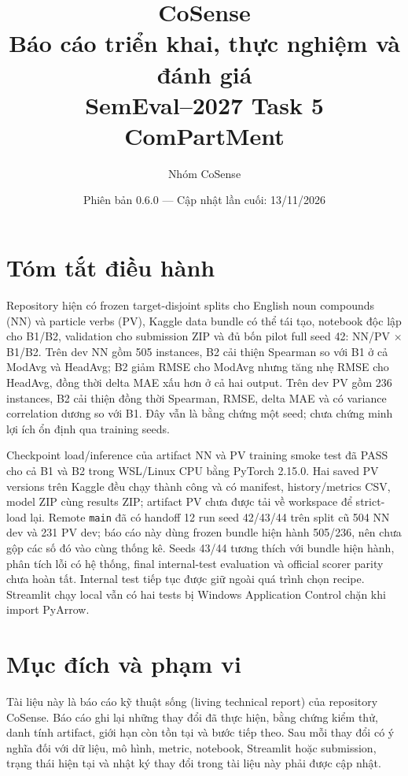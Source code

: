 \documentclass[11pt,a4paper]{article}
\title{\textbf{CoSense}\\Báo cáo triển khai, thực nghiệm và đánh giá\\SemEval--2027 Task 5 ComPartMent}
\author{Nhóm CoSense}
\date{Phiên bản 0.6.0 --- Cập nhật lần cuối: 13/11/2026}
\newcommand{\code}[1]{\nolinkurl{#1}}
\begin{document}
\maketitle
\tableofcontents
\newpage

\section{Tóm tắt điều hành}

Repository hiện có frozen target-disjoint splits cho English noun compounds (NN) và particle verbs (PV), Kaggle data bundle có thể tái tạo, notebook độc lập cho B1/B2, validation cho submission ZIP và đủ bốn pilot full seed 42: NN/PV $\times$ B1/B2. Trên dev NN gồm 505 instances, B2 cải thiện Spearman so với B1 ở cả ModAvg và HeadAvg; B2 giảm RMSE cho ModAvg nhưng tăng nhẹ RMSE cho HeadAvg, đồng thời delta MAE xấu hơn ở cả hai output. Trên dev PV gồm 236 instances, B2 cải thiện đồng thời Spearman, RMSE, delta MAE và có variance correlation dương so với B1. Đây vẫn là bằng chứng một seed; chưa chứng minh lợi ích ổn định qua training seeds.

Checkpoint load/inference của artifact NN và PV training smoke test đã PASS cho cả B1 và B2 trong WSL/Linux CPU bằng PyTorch 2.15.0. Hai saved PV versions trên Kaggle đều chạy thành công và có manifest, history/metrics CSV, model ZIP cùng results ZIP; artifact PV chưa được tải về workspace để strict-load lại. Remote \code{main} đã có handoff 12 run seed 42/43/44 trên split cũ 504 NN dev và 231 PV dev; báo cáo này dùng frozen bundle hiện hành 505/236, nên chưa gộp các số đó vào cùng thống kê. Seeds 43/44 tương thích với bundle hiện hành, phân tích lỗi có hệ thống, final internal-test evaluation và official scorer parity chưa hoàn tất. Internal test tiếp tục được giữ ngoài quá trình chọn recipe. Streamlit chạy local vẫn có hai tests bị Windows Application Control chặn khi import PyArrow.

\section{Mục đích và phạm vi}

Tài liệu này là báo cáo kỹ thuật sống (living technical report) của repository CoSense. Báo cáo ghi lại những thay đổi đã thực hiện, bằng chứng kiểm thử, danh tính artifact, giới hạn còn tồn tại và bước tiếp theo. Sau mỗi thay đổi có ý nghĩa đối với dữ liệu, mô hình, metric, notebook, Streamlit hoặc submission, trạng thái hiện tại và nhật ký thay đổi trong tài liệu này phải được cập nhật.
\end{document}
